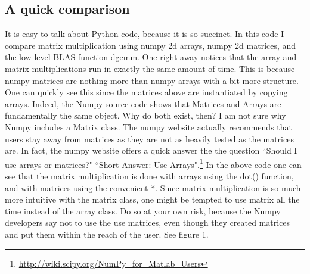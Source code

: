 \subsection {A quick comparison}
It is easy to talk about Python code, because it is so succinct. In this code I compare matrix multiplication using numpy 2d arrays, numpy 2d matrices, and the low-level BLAS function dgemm. One right away notices that the array and matrix multiplications run in exactly the same amount of time. This is because numpy matrices are nothing more than numpy arrays with a bit more structure. One can quickly see this since the matrices above are instantiated by copying arrays. Indeed, the Numpy source code shows that Matrices and Arrays are fundamentally the same object. Why do both exist, then?
I am not sure why Numpy includes a Matrix class. The numpy website actually recommends that users stay away from matrices as they are not as heavily tested as the matrices are. In fact, the numpy website offers a quick answer the the question ``Should I use arrays or matrices?" ``Short Answer: Use Arrays".\footnote{\url{http://wiki.scipy.org/NumPy_for_Matlab_Users}} In  the above code one can see that the matrix multiplication is done with arrays using the dot() function, and with matrices using the convenient *. Since matrix multiplication is so much more intuitive with the matrix class, one might be tempted to use matrix all the time instead of the array class. Do so at your own risk, because the Numpy developers say not to use the use matrices, even though they created matrices and put them within the reach of the user. See figure 1.
